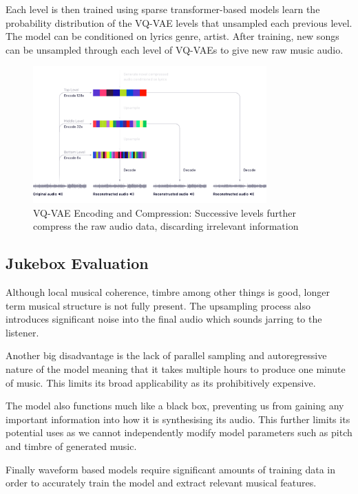 Each level is then trained using sparse transformer-based models learn the probability distribution of the VQ-VAE levels that unsampled each previous level. The model can be conditioned on lyrics genre, artist. After training, new songs can be unsampled through each level of VQ-VAEs to give new raw music audio.

\begin{figure}[!ht]
    \centering
    \includegraphics[width=0.8\textwidth]{literature_review/vq-vae.png}
    \caption{VQ-VAE Encoding and Compression: Successive levels further compress the raw audio data, discarding irrelevant information}
    \label{fig:jukebox_example}
\end{figure}

\subsection{Jukebox Evaluation}

Although local musical coherence, timbre among other things is good, longer term musical structure is not fully present. The upsampling process also introduces significant noise into the final audio which sounds jarring to the listener.

Another big disadvantage is the lack of parallel sampling and autoregressive nature of the model meaning that it takes multiple hours to produce one minute of music. This limits its broad applicability as its prohibitively expensive.

The model also functions much like a black box, preventing us from gaining any important information into how it is synthesising its audio. This further limits its potential uses as we cannot independently modify model parameters such as pitch and timbre of generated music.

Finally waveform based models require significant amounts of training data in order to accurately train the model and extract relevant musical features.

